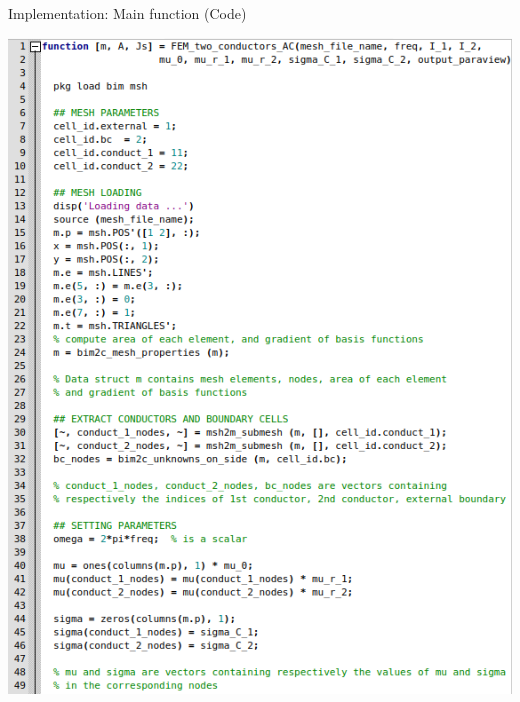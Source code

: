 \documentclass[aspectratio=54,xcolor=dvipsnames]{beamer}
\begin{document}
\begin{frame}{Implementation: Main function (Code)}
    \begin{center}
        \begin{minipage}{0.49\textwidth}
            \centering
            \includegraphics[width=\textwidth]{Images/Main_code1.png}
        \end{minipage}\hfill
        \begin{minipage}{0.49\textwidth}
            \centering

\end{minipage}
\end{center}
\end{frame}
\end{document}
